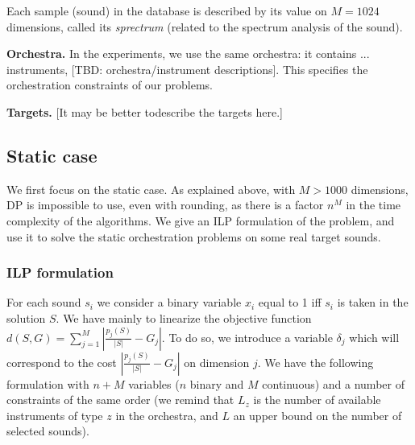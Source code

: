 \documentclass[a4paper]{book}
\begin{document}
Each sample (sound) in the database is described by its value on $M=1024$ dimensions, called its {\it sprectrum} (related to the spectrum analysis of the sound). 

{\bf Orchestra.} In the experiments, we use the same orchestra: it contains ... instruments, [TBD: orchestra/instrument descriptions]. This specifies the orchestration constraints of our problems. 

{\bf Targets.} [It may be better todescribe the targets here.]

\subsection{Static case}\label{sec:expstat}

We first focus on the static case. As explained above, with $M>1000$ dimensions, DP is impossible to use, even with rounding, as there is a factor $n^M$ in the time complexity of the algorithms. We give an ILP formulation of the problem, and use it to solve the static orchestration problems on some real target sounds.

\subsubsection{ILP formulation}

For each sound $s_i$ we consider a binary variable $x_i$ equal to 1 iff $s_i$ is taken in the solution $S$.
We have mainly to linearize the objective function $d(S,G)=\sum_{j=1}^M \left| \frac{p_j(S)}{|S|} - G_j\right|$. To do so, we introduce a variable $\delta_j$ which will correspond to the cost $| \frac{p_j(S)}{|S|} - G_j|$ on dimension $j$. We have the following formulation with $n+M$ variables ($n$ binary and $M$ continuous) and a number of constraints of the same order (we remind that $L_z$ is the number of available instruments of type $z$ in the orchestra, and $L$ an upper bound on the number of selected sounds). 
\end{document}
